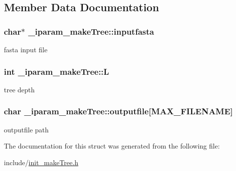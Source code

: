 \subsection{Member Data Documentation}
\hypertarget{struct__iparam__makeTree_a864d463534785b7f6cc7b9d52664b443}{
\subsubsection[{inputfasta}]{\setlength{\rightskip}{0pt plus 5cm}char$\ast$ \+\_\+iparam\+\_\+make\+Tree\+::inputfasta}}\label{struct__iparam__makeTree_a864d463534785b7f6cc7b9d52664b443}
fasta input file \hypertarget{struct__iparam__makeTree_a56fd13b9cf051d4770f40b015a295fd3}{
\subsubsection[{L}]{\setlength{\rightskip}{0pt plus 5cm}int \+\_\+iparam\+\_\+make\+Tree\+::\+L}}\label{struct__iparam__makeTree_a56fd13b9cf051d4770f40b015a295fd3}
tree depth \hypertarget{struct__iparam__makeTree_a9506dbea307f1fda5cc22c84bc4d035f}{
\subsubsection[{outputfile}]{\setlength{\rightskip}{0pt plus 5cm}char \+\_\+iparam\+\_\+make\+Tree\+::outputfile\mbox{[}{\bf M\+A\+X\+\_\+\+F\+I\+L\+E\+N\+A\+M\+E}\mbox{]}}}\label{struct__iparam__makeTree_a9506dbea307f1fda5cc22c84bc4d035f}
outputfile path 

The documentation for this struct was generated from the following file\+:\begin{DoxyCompactItemize}
\item 
include/\hyperlink{init__makeTree_8h}{init\+\_\+make\+Tree.\+h}\end{DoxyCompactItemize}
